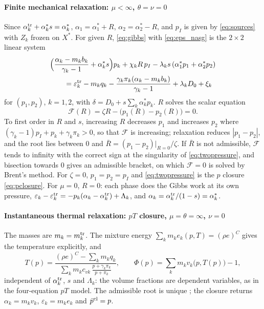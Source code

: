 \paragraph{Finite mechanical relaxation: $\mu<\infty$, $\theta=\nu=0$}
Since $\alpha^{\rm tr}_k+\alpha^*_ks=\alpha^*_k$, $\alpha_1=\alpha^*_1+R$, $\alpha_2=\alpha^*_2-R$, and $p_I$ is given by \eqref{eq:sources} with $Z_k$
frozen on $X^*$. For given $R$, \eqref{eq:gibbs} with \eqref{eq:eps_nasg} is the $2\times2$ linear system
\begin{equation}
\begin{aligned}
&\Big(\frac{\alpha_k-m_kb_k}{\gamma_k-1}+\alpha^*_ks\Big)p_k+\chi_kR\,p_I-\lambda_ks\,(\alpha^*_1p_1+\alpha^*_2p_2)\\
&\qquad=\varepsilon^{\rm tr}_k-m_kq_k-\frac{\gamma_k\pi_k(\alpha_k-m_kb_k)}{\gamma_k-1}+\lambda_kD_0+\xi_k
\end{aligned}
\label{eq:twopressure}
\end{equation}
for $(p_1,p_2)$, $k=1,2$, with $\delta=D_0+s\sum_k\alpha^*_kp_k$. $R$ solves the scalar equation
\[
\mathcal F(R)=\zeta R-\big(p_1(R)-p_2(R)\big)=0 .
\]
To first order in $R$ and $s$, increasing $R$ decreases $p_1$ and increases $p_2$ where $(\gamma_k-1)p_I+p_k+\gamma_k\pi_k>0$, so that
$\mathcal F$ is increasing; relaxation reduces $|p_1-p_2|$, and the root lies between $0$ and $\bar R=(p_1-p_2)|_{R=0}/\zeta$. If $\bar R$ is not
admissible, $\mathcal F$ tends to infinity with the correct sign at the singularity of \eqref{eq:twopressure}, and bisection towards
$0$ gives an admissible bracket, on which $\mathcal F=0$ is solved by Brent's method. For $\zeta=0$, $p_1=p_2=p_I$ and \eqref{eq:twopressure} is the $p$ closure \eqref{eq:pclosure}. For $\mu=0$, $R=0$: each phase does the Gibbs work at its own pressure,
$\varepsilon_k-\varepsilon^{\rm tr}_k=-p_k(\alpha_k-\alpha^{\rm tr}_k)+\Lambda_k$, and $\alpha_k=\alpha^{\rm tr}_k/(1-s)=\alpha^*_k$.

\paragraph{Instantaneous thermal relaxation: $pT$ closure, $\mu=\theta=\infty$, $\nu=0$}
The masses are $m_k=m^{\rm tr}_k$. The mixture energy $\sum_km_ke_k(p,T)=(\rho e)^C$ gives the temperature explicitly, and
\begin{equation}
T(p)=\frac{(\rho e)^C-\sum_km_kq_k}{\sum_km_kc_{vk}\,\frac{p+\gamma_k\pi_k}{p+\pi_k}},\qquad
\Phi(p)=\sum_km_kv_k\big(p,T(p)\big)-1 ,
\label{eq:pTclosure}
\end{equation}
independent of $\alpha^{\rm tr}_k$, $s$ and $\Lambda_k$: the volume fractions are dependent variables, as in the four-equation $pT$ model.
The admissible root is unique \cite{PelantiShyue2014}; the closure returns $\alpha_k=m_kv_k$, $\varepsilon_k=m_ke_k$ and $\bar p^{\rm cl}=p$.

